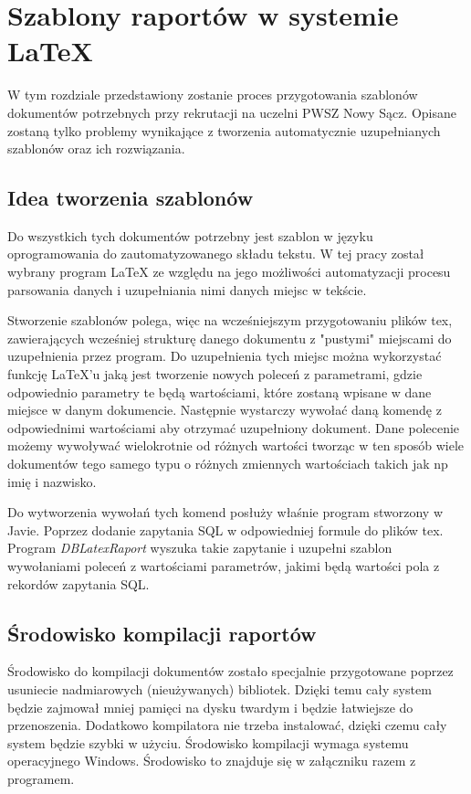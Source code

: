 \chapter{Szablony raportów w systemie LaTeX}
\label{ch:szablonyraportowwsystemielatex}

W tym rozdziale przedstawiony zostanie proces przygotowania szablonów dokumentów potrzebnych przy rekrutacji na uczelni PWSZ Nowy Sącz. Opisane zostaną tylko problemy wynikające z tworzenia automatycznie uzupełnianych szablonów oraz ich rozwiązania.

\section{Idea tworzenia szablonów}

Do wszystkich tych dokumentów potrzebny jest szablon w języku oprogramowania do zautomatyzowanego składu tekstu. W tej pracy został wybrany program LaTeX ze względu na jego możliwości automatyzacji procesu parsowania danych i uzupełniania nimi danych miejsc w tekście.
\par Stworzenie szablonów polega, więc na wcześniejszym przygotowaniu plików tex, zawierających wcześniej strukturę danego dokumentu z "pustymi" miejscami do uzupełnienia przez program. Do uzupełnienia tych miejsc można wykorzystać funkcję LaTeX'u jaką jest tworzenie nowych poleceń z parametrami, gdzie odpowiednio parametry te będą wartościami, które zostaną wpisane w dane miejsce w danym dokumencie. Następnie wystarczy wywołać daną komendę z odpowiednimi wartościami aby otrzymać uzupełniony dokument. Dane polecenie możemy wywoływać wielokrotnie od różnych wartości tworząc w ten sposób wiele dokumentów tego samego typu o różnych zmiennych wartościach takich jak np imię i nazwisko. 
\par Do wytworzenia wywołań tych komend posłuży właśnie program stworzony w Javie. Poprzez dodanie zapytania SQL w odpowiedniej formule do plików tex. Program \emph{DBLatexRaport} wyszuka takie zapytanie i uzupełni szablon wywołaniami poleceń z wartościami parametrów, jakimi będą wartości pola z rekordów zapytania SQL. 

\section{Środowisko kompilacji raportów}

Środowisko do kompilacji dokumentów zostało specjalnie przygotowane poprzez usuniecie nadmiarowych (nieużywanych) bibliotek. Dzięki temu cały system będzie zajmował mniej pamięci na dysku twardym i będzie łatwiejsze do przenoszenia. Dodatkowo kompilatora nie trzeba instalować, dzięki czemu cały system będzie szybki w użyciu. Środowisko kompilacji wymaga systemu operacyjnego Windows. Środowisko to znajduje się w załączniku razem z programem.


